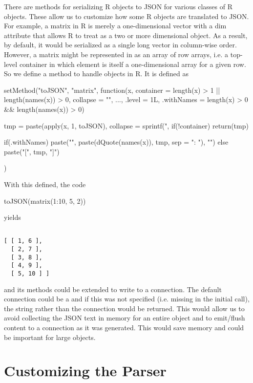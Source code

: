 \documentclass[article]{jss}
\def\hyperlabel#1{}
\begin{document}
There are methods for serializing R objects to JSON for various
classes of R objects.  These allow us to customize how some R objects
are translated to JSON. 
For example, a matrix in R is
merely a one-dimensional vector with a %
dim attribute
that allows R to treat as a two or more dimensional object. As a
result, by default, it would be serialized as a single long vector in column-wise
order.  However, a matrix might be represented in
 as an array of row arrays, i.e. a top-level container in
which element is itself a one-dimensional array for a given row.  
So we define a method to handle  objects in R.
It is defined as 
\begin{CodeChunk}
\begin{CodeInput}
setMethod("toJSON", "matrix",
    function(x, container = length(x) > 1 || 
                                length(names(x)) > 0, 
             collapse = "\n", ..., .level = 1L, 
             .withNames = length(x) > 0 && length(names(x)) > 0) {
      tmp = paste(apply(x, 1, toJSON), 
                  collapse = sprintf(",%
      if(!container)
        return(tmp)

       if(.withNames)
         paste("{", paste(dQuote(names(x)), tmp, sep = ": "), "}")
       else
         paste("[", tmp, "]")
    })
\end{CodeInput}
\end{CodeChunk}
With this defined, the code
\begin{CodeChunk}
\begin{CodeInput}
toJSON(matrix(1:10, 5, 2))
\end{CodeInput}
\end{CodeChunk}
yields
\begin{verbatim}

[ [ 1, 6 ],
  [ 2, 7 ],
  [ 3, 8 ],
  [ 4, 9 ],
  [ 5, 10 ] ]

\end{verbatim}


 and its methods could be extended to write to
a connection.  The default connection could be a
 and if this was not specified
(i.e. missing in the initial call), the string rather than the
connection would be returned.
This would allow us to avoid collecting the JSON text in memory for
an entire object and to emit/flush content to a connection as it was generated.
This would save memory and could be important for large objects.

\section{Customizing the Parser}
\label{sec:customizingParser}\hyperlabel{sec:customizingParser}%
\end{document}

